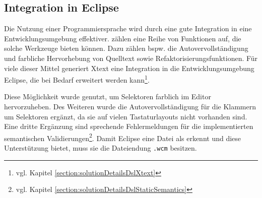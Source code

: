 \subsection{Integration in Eclipse}
    Die Nutzung einer Programmiersprache wird durch eine gute Integration in eine
    Entwicklungsumgebung effektiver.
    \citet[Kapitel 12.]{voelter:DslEngineering} zählen eine Reihe von
    Funktionen auf, die solche Werkzeuge bieten können.
    Dazu zählen bspw. die Autovervollständigung und farbliche Hervorhebung von Quelltext
    sowie Refaktorisierungsfunktionen.
    Für viele dieser Mittel generiert Xtext eine Integration
    in die Entwicklungsumgebung Eclipse,
    die bei Bedarf erweitert werden kann\footnote{vgl. Kapitel \ref{section:solutionDetailsDslXtext}}.

    Diese Möglichkeit wurde genutzt, um Selektoren farblich im Editor hervorzuheben.
    Des Weiteren wurde die Autovervollständigung für die Klammern um Selektoren ergänzt,
    da sie auf vielen Tastaturlayouts nicht vorhanden sind.
    Eine dritte Ergänzung sind sprechende Fehlermeldungen für die implementierten
    semantischen Validierungen\footnote{vgl. Kapitel \ref{section:solutionDetailsDslStaticSemantics}}.
    Damit Eclipse eine Datei als {\classificationModel} erkennt und diese Unterstützung bietet,
    muss sie die Dateiendung \texttt{.wcm} besitzen.
